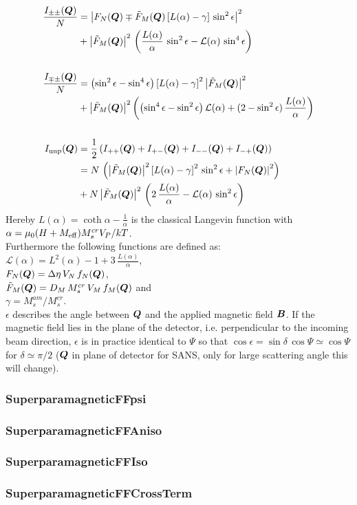 \begin{align}
\frac{I_{\pm\pm}(\BM{Q})}{N} &= \abs{F_N(\BM{Q}) \mp \tilde
F_M(\BM{Q}) \left[ L(\alpha)-\gamma\right]\,\sin^2\epsilon}^2
\label{eq:ISQ_ppmm}\\
&+ \abs{\tilde F_M(\BM{Q})}^2\, \left( \frac{L(\alpha)}{\alpha}\,
\sin^2\epsilon - \mathcal{L}(\alpha)
\, \sin^4\epsilon \right) \nonumber \\
\nonumber \\
\frac{I_{\mp\pm}(\BM{Q})}{N} &= \left( \sin^2\epsilon -
\sin^4\epsilon \right) \left[L(\alpha)-\gamma\right]^2
\abs{\tilde F_M(\BM{Q})}^2 %
\label{eq:ISQ_pmmp}\\
&+ \abs{\tilde F_M(\BM{Q})}^2  \left( \left(
\sin^4\epsilon-\sin^2\epsilon \right) \mathcal{L}(\alpha) +
(2-\sin^2\epsilon)\, \frac{L(\alpha)}{\alpha}\right) \nonumber \\
\nonumber \\
I_{\rm unp}(\BM{Q}) &=  \frac{1}{2}
\left(I_{++}(\BM{Q})+I_{+-}(\BM{Q})+I_{--}(\BM{Q})+I_{-+}(\BM{Q})
\right)
\nonumber \\
&= N\, \left(\abs{\tilde F_M(\BM{Q})}^2 \left[
L(\alpha)-\gamma\right]^2\,\sin^2\epsilon
   + \abs{F_N(\BM{Q})}^2 \right)
\label{eq:ISQ_unp} \\
&+ N \, \abs{\tilde F_M(\BM{Q})}^2\, \left( 2\,
\frac{L(\alpha)}{\alpha} - \mathcal{L}(\alpha)\,
\sin^2\epsilon\right) \nonumber \label{eq:ISQ}
\end{align}
Hereby $L(\alpha) = \coth \alpha - \frac{1}{\alpha}$ is the
classical Langevin function with \\
$\alpha = \mu_0(H+M_{\rm
eff})M_s^{cr} V_P/kT$. \\
Furthermore the following functions are defined as:\\
$\mathcal{L}(\alpha)=L^2(\alpha)-1+3\,\frac{L(\alpha)}{\alpha}$, \\
$F_N(\BM{Q})=\Delta\eta\, V_N\, f_N(\BM{Q})$,\\
$\tilde F_M(\BM{Q}) = D_M\, M_s^{cr}\, V_M\,f_M(\BM{Q})$ and \\
$\gamma = M_s^{am}/M_s^{cr}$. \\
$\epsilon$ describes the angle between $\BM{Q}$ and the applied
magnetic field $\BM{B}$. If the magnetic field lies in the plane of
the detector, i.e. perpendicular to the incoming beam direction,
$\epsilon$ is in practice identical to $\Psi$ so that $\cos \epsilon
= \sin\delta\, \cos\Psi \simeq \cos \Psi$ for $\delta \simeq \pi/2$
($\BM{Q}$ in plane of detector for SANS, only for large scattering
angle this will change).


\subsubsection{SuperparamagneticFFpsi}
\label{sect:superparFFpsi}

\subsubsection{SuperparamagneticFFAniso}
\label{sect:superparFFAniso}

\subsubsection{SuperparamagneticFFIso}
\label{sect:superparFFIso}

\subsubsection{SuperparamagneticFFCrossTerm}
\label{sect:superparFFCrossTerm}

